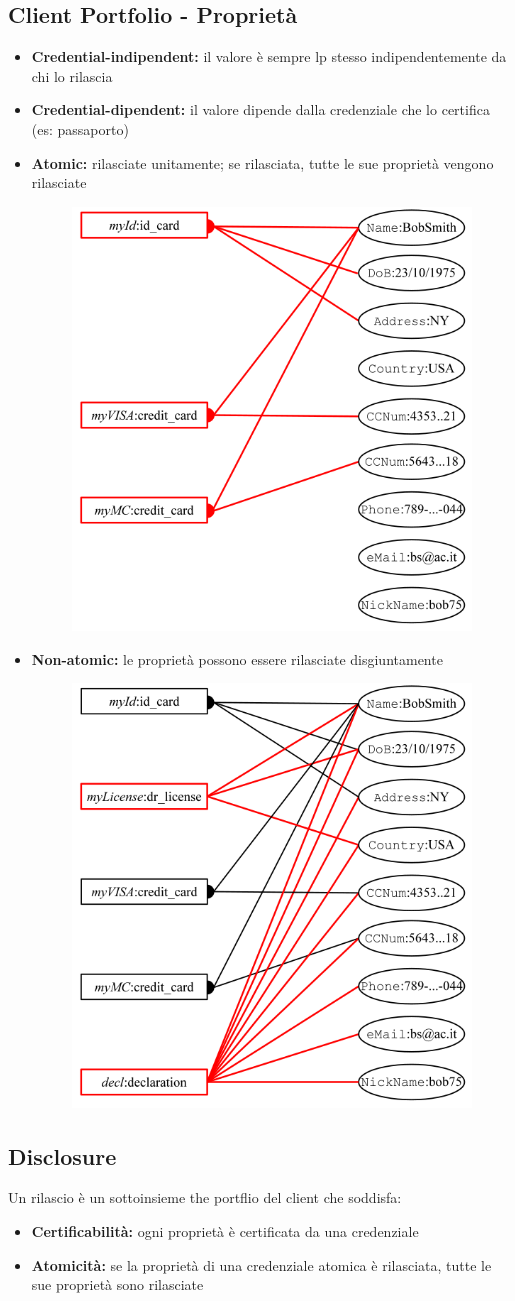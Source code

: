 \documentclass{report}
\begin{document}
\subsection{Client Portfolio - Proprietà}
\begin{itemize}
    \item \textbf{Credential-indipendent:} il valore è sempre lp stesso indipendentemente da chi lo rilascia
    \item \textbf{Credential-dipendent:} il valore dipende dalla credenziale che lo certifica (es: passaporto)
    \item \textbf{Atomic:} rilasciate unitamente; se rilasciata, tutte le sue proprietà vengono rilasciate 
    \begin{figure}[ht]
    \centering
    \includegraphics[width=0.6\linewidth]{images/ atomic.png}
    \end{figure}
    \item \textbf{Non-atomic:} le proprietà possono essere rilasciate disgiuntamente 
    \begin{figure}[ht]
        \centering
        \includegraphics[width=0.4\linewidth]{images/non-atomi.png}
    \end{figure}
\end{itemize}

\newpage
\subsection{Disclosure}
Un rilascio è un sottoinsieme the portflio del client che soddisfa:
\begin{itemize}
    \item \textbf{Certificabilità:} ogni proprietà è certificata da una credenziale
    \item \textbf{Atomicità:} se la proprietà di una credenziale atomica è rilasciata, tutte le sue proprietà sono rilasciate 
\end{itemize}
\end{document}
